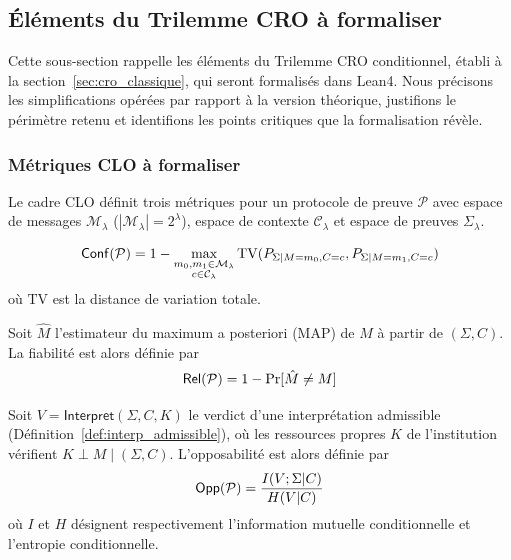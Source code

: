 \subsection{\'El\'ements du Trilemme CRO \`a formaliser}
\label{subsec:elements_formaliser}
\begin{sloppypar}
Cette sous-section rappelle les \'el\'ements du Trilemme CRO conditionnel,
\'etabli \`a la section~\ref{sec:cro_classique}, qui seront formalis\'es dans
Lean4. Nous pr\'ecisons les simplifications op\'er\'ees par rapport \`a la
version th\'eorique, justifions le p\'erim\`etre retenu et identifions les
points critiques que la formalisation r\'ev\`ele.

\subsubsection{M\'etriques CLO \`a formaliser}
\label{subsubsec:metriques_formaliser}

Le cadre CLO d\'efinit trois
m\'etriques pour un protocole de preuve $\mathcal{P}$ avec espace de messages
$\mathcal{M}_\lambda$ ($|\mathcal{M}_\lambda| = 2^\lambda$), espace de
contexte $\mathcal{C}_\lambda$ et espace de preuves $\Sigma_\lambda$.

\begin{definition}[Confidentialit\'e]\label{def:conf_lean4}
\begin{equation}
\mathsf{Conf}(\mathcal{P}) = 1 - \max_{\substack{m_0,m_1\in\mathcal{M}_\lambda\\c\in\mathcal{C}_\lambda}}
   \mathrm{TV}(P_{\Sigma|M=m_0,C=c}, P_{\Sigma|M=m_1,C=c})
\end{equation}
o\`u $\mathrm{TV}$ est la distance de variation totale.
\end{definition}

\begin{definition}[Fiabilit\'e]\label{def:rel_lean4}
Soit $\hat{M}$ l'estimateur du maximum a posteriori (MAP) de $M$ \`a partir de $(\Sigma, C)$. La fiabilit\'e
est alors d\'efinie par
\begin{equation}
\mathsf{Rel}(\mathcal{P}) = 1 - \Pr[\hat{M} \neq M]
\end{equation}
\end{definition}

\begin{definition}[Opposabilit\'e]\label{def:opp_lean4}
Soit $V = \mathsf{Interpret}(\Sigma, C, K)$ le verdict d'une interpr\'etation
admissible (D\'efinition~\ref{def:interp_admissible}), o\`u les ressources propres $K$
de l'institution v\'erifient $K \perp M \mid (\Sigma, C)$. L'opposabilit\'e est alors
d\'efinie par
\begin{equation}
\mathsf{Opp}(\mathcal{P}) = \frac{I(V;\Sigma|C)}{H(V|C)}
\end{equation}
o\`u $I$ et $H$ d\'esignent respectivement l'information mutuelle
conditionnelle et l'entropie conditionnelle.
\end{definition}


\end{sloppypar}
